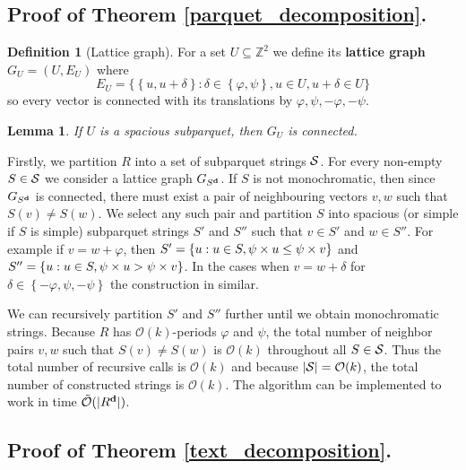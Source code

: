\documentclass[11pt]{article}
\newcommand{\Z}{\mathbb{Z}}
\renewcommand{\O}{\mathcal{O}}
\newcommand{\tO}{\tilde{\mathcal{O}}}
\renewcommand{\phi}{\varphi}
\newcommand{\set}[1]{\left\lbrace #1 \right\rbrace}
\newcommand{\bigset}[1]{\big \lbrace #1 \big \rbrace}
\theoremstyle{plain}
\newtheorem{lemma}{Lemma}
\theoremstyle{definition}
\newtheorem{definition}{Definition}
\theoremstyle{remark}
\begin{document}
\subsection{Proof of Theorem \ref{parquet_decomposition}.}


\begin{definition}[Lattice graph]
	For a set $U \subseteq \Z^2$ we define its \textbf{lattice graph} $G_U = (U, E_U)$ where
	$$ E_U = \bigset{\set{u, u + \delta} : \delta \in \set{\phi, \psi}, u \in U, u + \delta \in U} $$ 
	so every vector is connected with its translations by $\phi, \psi, -\phi, -\psi$.
\end{definition}


\begin{lemma}
	If $U$ is a spacious subparquet, then $G_U$ is connected.
\end{lemma}


Firstly, we partition $R$ into a set of subparquet strings $\S$.
For every non-empty $S \in \S$ we consider a lattice graph $G_{\d{S}}$. If $S$ is not monochromatic, then since $G_{\d{S}}$ is connected, there must exist a pair of neighbouring vectors $v, w$ such that $S(v) \neq S(w)$.
We select any such pair and partition $S$ into spacious (or simple if $S$ is simple) subparquet strings $S'$ and $S''$ such that $v \in S'$ and $w \in S''$.
For example if $v = w + \phi$, then $S' = \set{u : u \in S, \s{u} \le \s{v}}$ and $S'' = \set{u : u \in S, \s{u} > \s{v}}$.
In the cases when $v = w + \delta$ for $\delta \in \set{-\phi, \psi, -\psi}$ the construction in similar.

We can recursively partition $S'$ and $S''$ further until we obtain monochromatic strings.
Because $R$ has $\O(k)$-periods $\phi$ and $\psi$, the total number of neighbor pairs $v, w$ such that $S(v) \neq S(w)$ is $\O(k)$ throughout all $S \in \S$.
Thus the total number of recursive calls is $\O(k)$ and because $|\S| = \O(k)$, the total number of constructed strings is $\O(k)$.
The algorithm can be implemented to work in time $\tO(|\d{R}|)$.


\subsection{Proof of Theorem \ref{text_decomposition}.}
\end{document}
